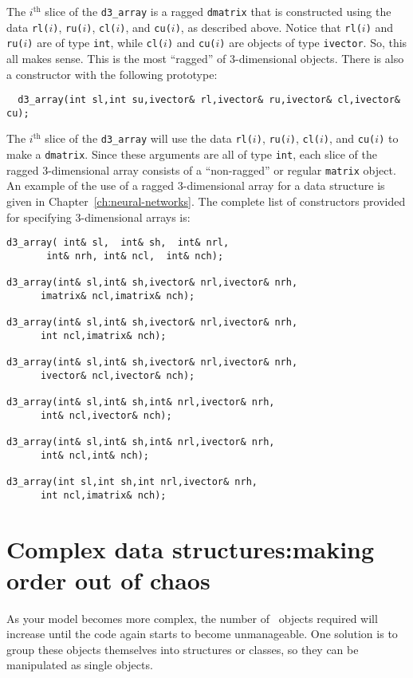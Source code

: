 \documentclass{admbmanual}
\begin{document}
The $i^\textrm{th}$ slice of the \texttt{d3\_array} is a ragged \texttt{dmatrix}
that is constructed using the data \texttt{rl($i$)}, \texttt{ru($i$)},
\texttt{cl($i$)}, and \texttt{cu($i$)}, as described above. Notice that
\texttt{rl($i$)} and \texttt{ru($i$)} are of type \texttt{int}, while
\texttt{cl($i$)} and \texttt{cu($i$)} are objects of type \texttt{ivector}. So,
this all makes sense. This is the most ``ragged'' of 3-dimensional objects.
There is also a constructor with the following prototype:
\begin{lstlisting}
  d3_array(int sl,int su,ivector& rl,ivector& ru,ivector& cl,ivector& cu);
\end{lstlisting}
The $i^\textrm{th}$ slice of the \texttt{d3\_array} will use the data
\texttt{rl($i$)}, \texttt{ru($i$)}, \texttt{cl($i$)}, and \texttt{cu($i$)} to
make a \texttt{dmatrix}. Since these arguments are all of type \texttt{int},
each slice of the ragged 3-dimensional array consists of a ``non-ragged'' or
regular \texttt{matrix} object. An example of the use of a ragged 3-dimensional
array for a data structure is given in Chapter~\ref{ch:neural-networks}. The
complete list of constructors provided for specifying 3-dimensional arrays is:
\begin{lstlisting}
d3_array( int& sl,  int& sh,  int& nrl,
       int& nrh, int& ncl,  int& nch);

d3_array(int& sl,int& sh,ivector& nrl,ivector& nrh,
      imatrix& ncl,imatrix& nch);

d3_array(int& sl,int& sh,ivector& nrl,ivector& nrh,
      int ncl,imatrix& nch);

d3_array(int& sl,int& sh,ivector& nrl,ivector& nrh,
      ivector& ncl,ivector& nch);

d3_array(int& sl,int& sh,int& nrl,ivector& nrh,
      int& ncl,ivector& nch);

d3_array(int& sl,int& sh,int& nrl,ivector& nrh,
      int& ncl,int& nch);

d3_array(int sl,int sh,int nrl,ivector& nrh,
      int ncl,imatrix& nch);
\end{lstlisting}

\section{Complex data structures:\br making order out of chaos}

As your model becomes more complex, the number of \scAD\ objects required will
increase until the code again starts to become unmanageable. One solution is to
group these objects themselves into structures or classes, so they can be
manipulated as single objects.
\end{document}

